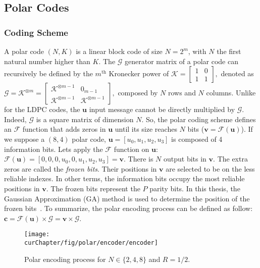 \subsection{Polar Codes}
\label{sec:ctx_polar}

\subsubsection{Coding Scheme}

A polar code $(N,K)$ is a linear block code of size $N = 2^m$, with $N$ the
first natural number higher than $K$. The $\bm{\mathcal{G}}$ generator matrix of
a polar code can recursively be defined by the $m^\text{th}$ Kronecker power of
$\bm{\mathcal{K}} =
\begin{bmatrix}
1 & 0 \\
1 & 1
\end{bmatrix},$
denoted as
$
\bm{\mathcal{G}} = \bm{\mathcal{K}}^{\otimes m} =
\begin{bmatrix}
\bm{\mathcal{K}}^{\otimes m-1} & 0_{m -1} \\
\bm{\mathcal{K}}^{\otimes m-1} & \bm{\mathcal{K}}^{\otimes m-1}
\end{bmatrix},
$
composed by $N$ rows and $N$ columns. Unlike for the LDPC codes, the $\bm{u}$
input message cannot be directly multiplied by $\bm{\mathcal{G}}$. Indeed,
$\bm{\mathcal{G}}$ is a square matrix of dimension $N$. So, the polar coding
scheme defines an $\mathcal{F}$ function that adds zeros in $\bm{u}$ until its
size reaches $N$ bits ($\bm{v} = \mathcal{F}(\bm{u})$). If we suppose a $(8,4)$
polar code, $\bm{u} = [u_0, u_1, u_2, u_3]$ is composed of 4 information bits.
Lets apply the $\mathcal{F}$ function on $\bm{u}$: $\mathcal{F}(\bm{u}) =
[0, 0, 0, u_0, 0, u_1, u_2, u_3] = \bm{v}$. There is $N$ output bits in
$\bm{v}$. The extra zeros are called the \emph{frozen bits}. Their positions in
$\bm{v}$ are selected to be on the less reliable indexes. In other terms, the
information bits occupy the most reliable positions in $\bm{v}$. The frozen bits
represent the $P$ parity bits. In this thesis, the Gaussian Approximation (GA)
method is used to determine the position of the frozen bits~\cite{Trifonov2012}.
To summarize, the polar encoding process can be defined as follow: $\bm{c} =
\mathcal{F}(\bm{u}) \times \bm{\mathcal{G}} = \bm{v} \times \bm{\mathcal{G}}$.

\begin{figure}[htp]
  \centering
  \texttt{[image: \\curChapter/fig/polar/encoder/encoder]}
  \caption{Polar encoding process for $N \in \{2, 4, 8\}$ and $R = 1/2$.}
  \label{fig:ctx_polar_encoder}
\end{figure}

